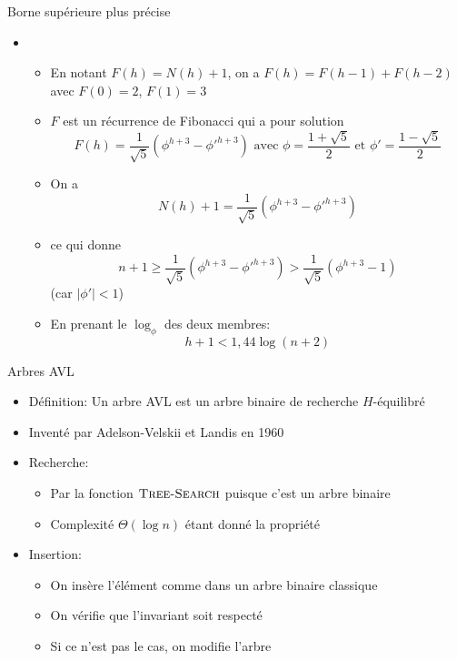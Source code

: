 \begin{frame}{Borne supérieure plus précise}
\begin{itemize}
\item[]
\begin{itemize}
\item En notant $F(h)=N(h)+1$, on a $F(h)=F(h-1)+F(h-2)$ avec $F(0)=2$, $F(1)=3$
\item $F$ est un récurrence de Fibonacci qui a pour solution
 $$F(h)=\frac{1}{\sqrt{5}} (\phi^{h+3}-\phi'^{h+3})\mbox{ avec }\phi=\frac{1+\sqrt{5}}{2}\mbox{ et }\phi'=\frac{1-\sqrt{5}}{2}$$
\item On a $$N(h)+1=\frac{1}{\sqrt{5}} (\phi^{h+3}-\phi'^{h+3})$$
\item ce qui donne
$$n+1\geq \frac{1}{\sqrt{5}} (\phi^{h+3}-\phi'^{h+3})> \frac{1}{\sqrt{5}} (\phi^{h+3}-1)$$
(car $|\phi'|<1$)
\item En prenant le $\log_{\phi}$ des deux membres:
$$h+1<1,44\log (n+2)$$
\end{itemize}
\end{itemize}

\end{frame}

\begin{frame}{Arbres AVL}

\begin{itemize}
\item \alert{Définition:} Un arbre AVL est un arbre binaire de
  recherche $H$-équilibré
\item Inventé par Adelson-Velskii et Landis en 1960
\item Recherche:
\begin{itemize}
\item Par la fonction $\textnormal{\scshape Tree-Search}$ puisque c'est un arbre binaire
\item Complexité $\Theta(\log n)$ étant donné la propriété
\end{itemize}
\item Insertion:
\begin{itemize}
\item On insère l'élément comme dans un arbre binaire classique
\item On vérifie que l'invariant soit respecté
\item Si ce n'est pas le cas, on modifie l'arbre
\end{itemize}
\end{itemize}
\end{frame}

